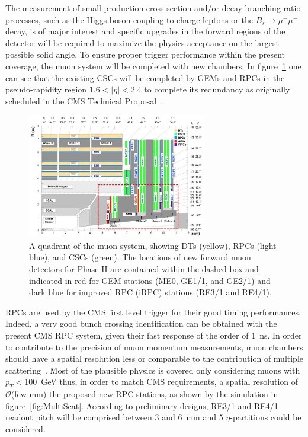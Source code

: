 The measurement of small production cross-section and/or decay branching ratio processes, such as the Higgs boson coupling to charge leptons or the $B_s \longrightarrow \mu^+\mu^-$ decay, is of major interest and specific upgrades in the forward regions of the detector will be required to maximize the physics acceptance on the largest possible solid angle. To ensure proper trigger performance within the present coverage, the muon system will be completed with new chambers. In figure~\ref{fig:Quadrant} one can see that the existing \acfp{CSC} will be completed by \acfp{GEM} and \acfp{RPC} in the pseudo-rapidity region $1.6<\vert\eta\vert<2.4$ to complete its redundancy as originally scheduled in the CMS Technical Proposal~\cite{CMSTP}.

\begin{figure}[H]
	\centering
	\includegraphics[width=0.7\textwidth]{fig/chapt2/MuonUpgrade-Plans.jpg}
	\caption{\label{fig:Quadrant} A quadrant of the muon system, showing DTs (yellow), RPCs (light blue), and CSCs (green). The locations of new forward muon detectors for Phase-II are contained within the dashed box and indicated in red for GEM stations (ME0, GE1/1, and GE2/1) and dark blue for improved RPC (iRPC) stations (RE3/1 and RE4/1).}
\end{figure}

RPCs are used by the CMS first level trigger for their good timing performances. Indeed, a very good bunch crossing identification can be obtained with the present CMS RPC system, given their fast response of the order of \SI{1}{ns}. In order to contribute to the precision of muon momentum measurements, muon chambers should have a spatial resolution less or comparable to the contribution of multiple scattering~\cite{MUONTDR}. Most of the plausible physics is covered only considering muons with $p_T<$\SI{100}{GeV} thus, in order to match CMS requirements, a spatial resolution of $\mathcal{O}$(few $\mathrm{mm}$) the proposed new RPC stations, as shown by the simulation in figure~\ref{fig:MultiScat}. According to preliminary designs, RE3/1 and RE4/1 readout pitch will be comprised between 3 and \SI{6}{mm} and 5 $\eta$-partitions could be considered.

